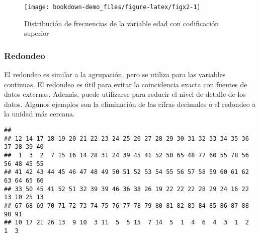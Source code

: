 \documentclass[
]{book}
\newenvironment{Shaded}{\begin{snugshade}}{\end{snugshade}}
\newcommand{\CommentTok}[1]{\textcolor[rgb]{0.56,0.35,0.01}{\textit{#1}}}
\newcommand{\DecValTok}[1]{\textcolor[rgb]{0.00,0.00,0.81}{#1}}
\newcommand{\FunctionTok}[1]{\textcolor[rgb]{0.00,0.00,0.00}{#1}}
\newcommand{\NormalTok}[1]{#1}
\newcommand{\OtherTok}[1]{\textcolor[rgb]{0.56,0.35,0.01}{#1}}
\newcommand{\SpecialCharTok}[1]{\textcolor[rgb]{0.00,0.00,0.00}{#1}}
\theoremstyle{definition}
\theoremstyle{definition}
\theoremstyle{definition}
\theoremstyle{definition}
\theoremstyle{remark}
\begin{document}
\begin{figure}
\texttt{[image: bookdown-demo\_files/figure-latex/figx2-1]} \caption{Distribución de frecuencias de la variable edad con codificación superior}\label{fig:figx2}
\end{figure}

\hypertarget{redondeo}{%
\subsubsection{Redondeo}\label{redondeo}}

El redondeo es similar a la agrupación, pero se utiliza para las variables continuas. El redondeo es útil para evitar la coincidencia exacta con fuentes de datos externas. Además, puede utilizarse para reducir el nivel de detalle de los datos. Algunos ejemplos son la eliminación de las cifras decimales o el redondeo a la unidad más cercana.

\begin{Shaded}
\end{Shaded}

\begin{verbatim}
## 
## 12 14 17 18 19 20 21 22 23 24 25 26 27 28 29 30 31 32 33 34 35 36 37 38 39 40 
##  1  3  2  7 15 16 14 28 31 24 39 45 41 52 50 65 48 77 60 55 78 56 56 48 45 55 
## 41 42 43 44 45 46 47 48 49 50 51 52 53 54 55 56 57 58 59 60 61 62 63 64 65 66 
## 33 50 45 41 52 51 32 39 39 46 36 38 26 19 22 22 22 28 29 24 16 22 13 10 25 13 
## 67 68 69 70 71 72 73 74 75 76 77 78 79 80 81 82 83 84 85 86 87 88 90 91 
## 10 17 21 26 13  9 10  3 11  5  5 15  7 14  5  1  4  6  4  3  1  2  1  3
\end{verbatim}

\begin{Shaded}
\end{Shaded}
\end{document}
